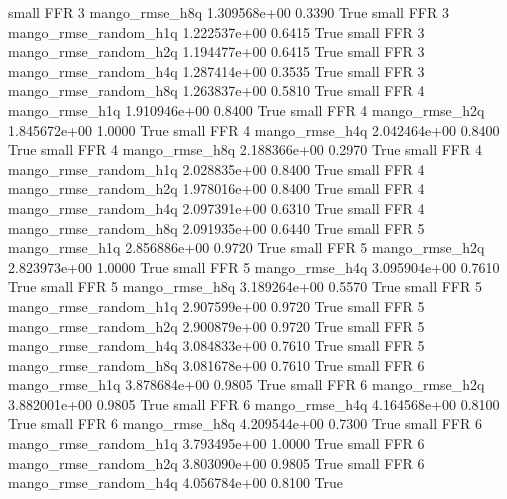      small      FFR                 3        mango_rmse_h8q 1.309568e+00      0.3390    True
     small      FFR                 3 mango_rmse_random_h1q 1.222537e+00      0.6415    True
     small      FFR                 3 mango_rmse_random_h2q 1.194477e+00      0.6415    True
     small      FFR                 3 mango_rmse_random_h4q 1.287414e+00      0.3535    True
     small      FFR                 3 mango_rmse_random_h8q 1.263837e+00      0.5810    True
     small      FFR                 4        mango_rmse_h1q 1.910946e+00      0.8400    True
     small      FFR                 4        mango_rmse_h2q 1.845672e+00      1.0000    True
     small      FFR                 4        mango_rmse_h4q 2.042464e+00      0.8400    True
     small      FFR                 4        mango_rmse_h8q 2.188366e+00      0.2970    True
     small      FFR                 4 mango_rmse_random_h1q 2.028835e+00      0.8400    True
     small      FFR                 4 mango_rmse_random_h2q 1.978016e+00      0.8400    True
     small      FFR                 4 mango_rmse_random_h4q 2.097391e+00      0.6310    True
     small      FFR                 4 mango_rmse_random_h8q 2.091935e+00      0.6440    True
     small      FFR                 5        mango_rmse_h1q 2.856886e+00      0.9720    True
     small      FFR                 5        mango_rmse_h2q 2.823973e+00      1.0000    True
     small      FFR                 5        mango_rmse_h4q 3.095904e+00      0.7610    True
     small      FFR                 5        mango_rmse_h8q 3.189264e+00      0.5570    True
     small      FFR                 5 mango_rmse_random_h1q 2.907599e+00      0.9720    True
     small      FFR                 5 mango_rmse_random_h2q 2.900879e+00      0.9720    True
     small      FFR                 5 mango_rmse_random_h4q 3.084833e+00      0.7610    True
     small      FFR                 5 mango_rmse_random_h8q 3.081678e+00      0.7610    True
     small      FFR                 6        mango_rmse_h1q 3.878684e+00      0.9805    True
     small      FFR                 6        mango_rmse_h2q 3.882001e+00      0.9805    True
     small      FFR                 6        mango_rmse_h4q 4.164568e+00      0.8100    True
     small      FFR                 6        mango_rmse_h8q 4.209544e+00      0.7300    True
     small      FFR                 6 mango_rmse_random_h1q 3.793495e+00      1.0000    True
     small      FFR                 6 mango_rmse_random_h2q 3.803090e+00      0.9805    True
     small      FFR                 6 mango_rmse_random_h4q 4.056784e+00      0.8100    True
